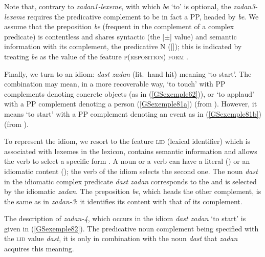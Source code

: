 \noindent
Note that, contrary to \emph{zadan1-lexeme}, with which \emph{be} `to' is optional, the \emph{zadan3-lexeme} requires the predicative complement to be in fact a PP, headed by \emph{be}. We assume that the preposition \emph{be} (frequent in the complement of a complex predicate) is contentless and shares syntactic (the [\prd $\pm$] value) and semantic information with its complement, the predicative N ([\cont {}]); this is indicated by treating \emph{be} as the value of the feature \textsc{p(reposition) form} \citep[Chapter~3]{ps}.  

Finally, we turn to an idiom: \emph{dast zadan} (lit.\ hand hit) meaning `to start'. The combination may mean, in a more recoverable way, `to touch' with PP complements denoting concrete objects (as in (\ref{GSexemple62})), or `to applaud' with a PP complement denoting a person (\ref{GSexemple81a}) (from \citealt[45]{pollet2012grammaire}). However, it means `to start' with a PP complement denoting an event as in (\ref{GSexemple81b}) (from \citealt[185]{pollet2012grammaire}).

\eal
	\label{GSexemple81} 
	\label{GSexemple81a}
		
    \label{GSexemple81b}
\zl

\noindent
To represent the idiom, we resort to the feature \textsc{lid} (lexical identifier) which is
associated with lexemes in the lexicon, contains semantic information and allows the
  verb to select a specific form \parencites[410--411]{Sag2007a}[127-133]{Sag2012a}. A noun or a
  verb can have a literal () or an idiomatic content (); the verb of the
  idiom selects the second one. The noun \emph{dast} in the idiomatic complex predicate \emph{dast zadan}
  corresponds to the  and is selected by the idiomatic \emph{zadan}. The preposition
\emph{be}, which heads the other complement, is the same as in \emph{zadan-3}: it identifies its
content with that of its complement.

The description of \emph{zadan-4}, which occurs in the idiom \emph{dast zadan} `to start' is given in (\ref{GSexemple82}). The predicative noun complement being specified with the \textsc{lid} value \emph{dast}, it is only in combination with the noun \emph{dast} that \emph{zadan} acquires this meaning.


